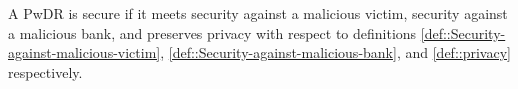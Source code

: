 


\begin{definition}[Security]\label{def::PwDR-security}
A PwDR is secure if it meets security against a malicious victim,  security against a malicious bank, and preserves privacy with respect to definitions \ref{def::Security-against-malicious-victim}, \ref{def::Security-against-malicious-bank}, and \ref{def::privacy} respectively. 
\end{definition}




%  
%  
%   
%   
%   
%   
%   
%
%
%  
%
%
%
%
%













